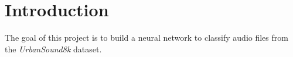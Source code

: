 \section{Introduction}

The goal of this project is to build a neural network to classify audio 
files from the \emph{UrbanSound8k} dataset.